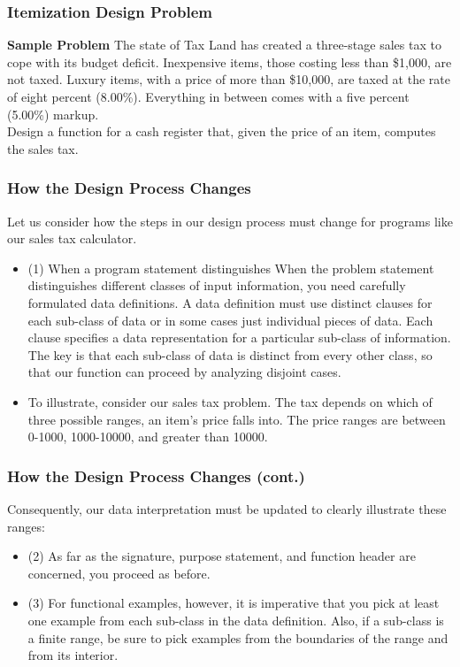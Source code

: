\documentclass{beamer}
\begin{document}
\begin{frame}
  \frametitle{Itemization Design Problem}
  \textbf{Sample Problem} The state of Tax Land has created a three-stage sales tax to cope with its budget deficit. Inexpensive items, those costing less than \$1,000, are not taxed. Luxury items, with a price of more than \$10,000, are taxed at the rate of eight percent (8.00\%). Everything in between comes with a five percent (5.00\%) markup.\\

Design a function for a cash register that, given the price of an item, computes the sales tax.
\end{frame}


\begin{frame}
  \frametitle{How the Design Process Changes}
  Let us consider how the steps in our design process must change for programs like our sales tax calculator.
  \begin{itemize}
  \item<2-> (1) When a program statement distinguishes When the problem statement distinguishes different classes of input information, you need carefully formulated data definitions.
    A data definition must use distinct clauses for each sub-class of data or in some cases just individual pieces of data. Each clause specifies a data representation for a particular sub-class of information. The key is that each sub-class of data is distinct from every other class, so that our function can proceed by analyzing disjoint cases.
  \item<3-> To illustrate, consider our sales tax problem. The tax depends on which of three possible ranges, an item's price falls into. The price ranges are
    between 0-1000, 1000-10000, and greater than 10000.       
  \end{itemize}
\end{frame}

\begin{frame}
  \frametitle{How the Design Process Changes (cont.)}
 Consequently, our data interpretation must be updated to clearly illustrate these ranges:
 \itemizeInterpretation
 \begin{itemize}
 \item<2-> (2) As far as the signature, purpose statement, and function header are concerned, you proceed as before.
 \item<3-> (3) For functional examples, however, it is imperative that you pick at least one example from each sub-class in the data definition. Also, if a sub-class is a finite range, be sure to pick examples from the boundaries of the range and from its interior.
 \end{itemize}
\end{frame}
\end{document}
